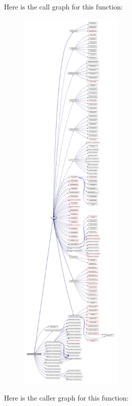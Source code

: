 Here is the call graph for this function\+:\nopagebreak
\begin{figure}[H]
\begin{center}
\leavevmode
\includegraphics[height=550pt]{namespacemodulemm5format_a1a626b0d9d1e86eb446e37da6e498536_cgraph}
\end{center}
\end{figure}
Here is the caller graph for this function\+:\nopagebreak
